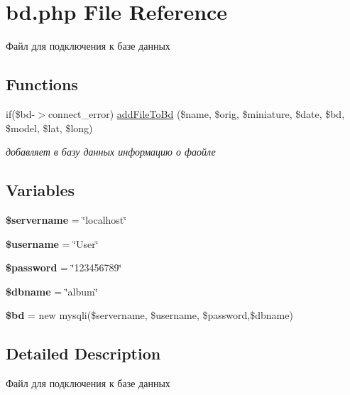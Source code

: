\hypertarget{bd_8php}{}\section{bd.\+php File Reference}
\label{bd_8php}


Файл для подключения к базе данных  


\subsection*{Functions}
\begin{DoxyCompactItemize}
\item 
if(\$bd-\/$>$connect\+\_\+error) \mbox{\hyperlink{bd_8php_ab58fa0da68711c0ff0f09e5fecd02c21}{add\+File\+To\+Bd}} (\$name, \$orig, \$miniature, \$date, \$bd, \$model, \$lat, \$long)
\begin{DoxyCompactList}\small\item\em добавляет в базу данных информацию о фаойле \end{DoxyCompactList}\end{DoxyCompactItemize}
\subsection*{Variables}
\begin{DoxyCompactItemize}
\item 
\mbox{\label{bd_8php_ad79b54e31bd1050001133c4d70f850fe}} 
{\bfseries \$servername} = \char`\"{}localhost\char`\"{}
\item 
\mbox{\label{bd_8php_a0eb82aa5f81cf845de4b36cd653c42cf}} 
{\bfseries \$username} = \char`\"{}User\char`\"{}
\item 
\mbox{\label{bd_8php_a607686ef9f99ea7c42f4f3dd3dbb2b0d}} 
{\bfseries \$password} = \char`\"{}123456789\char`\"{}
\item 
\mbox{\label{bd_8php_ac5111a571fffa2499732833bb7f0d8c1}} 
{\bfseries \$dbname} = \char`\"{}album\char`\"{}
\item 
\mbox{\label{bd_8php_acc3591d1c0945e5b934207901d1e06c0}} 
{\bfseries \$bd} = new mysqli(\$servername, \$username, \$password,\$dbname)
\end{DoxyCompactItemize}


\subsection{Detailed Description}
Файл для подключения к базе данных 

